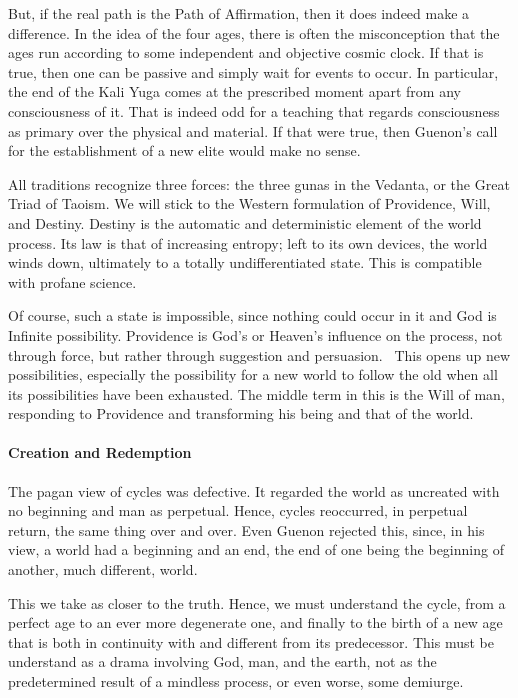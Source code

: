 But, if the real path is the Path of Affirmation, then it does indeed make a difference. In the idea of the four ages,
there is often the misconception that the ages run according to some independent and objective cosmic clock. If that is
true, then one can be passive and simply wait for events to occur. In particular, the end of the Kali Yuga comes at the
prescribed moment apart from any consciousness of it. That is indeed odd for a teaching that regards consciousness as
primary over the physical and material. If that were true, then Guenon's call for the
establishment of a new elite would make no sense.

All traditions recognize three forces: the three gunas in the Vedanta, or the Great Triad of Taoism. We will stick to
the Western formulation of Providence, Will, and Destiny. Destiny is the automatic and deterministic element of the
world process. Its law is that of increasing entropy; left to its own devices, the world winds down, ultimately to a
totally undifferentiated state. This is compatible with profane science.

Of course, such a state is impossible, since nothing could occur in it and God is Infinite possibility. Providence is
God's or Heaven's influence on the process, not through force, but rather
through suggestion and persuasion.  This opens up new possibilities, especially the possibility for a new world to
follow the old when all its possibilities have been exhausted. The middle term in this is the Will of man, responding
to Providence and transforming his being and that of the world.

\paragraph{Creation and Redemption}
The pagan view of cycles was defective. It regarded the world as uncreated with no beginning and man as perpetual.
Hence, cycles reoccurred, in perpetual return, the same thing over and over. Even Guenon rejected this, since, in his
view, a world had a beginning and an end, the end of one being the beginning of another, much different, world.

This we take as closer to the truth. Hence, we must understand the cycle, from a perfect age to an ever more degenerate
one, and finally to the birth of a new age that is both in continuity with and different from its predecessor. This
must be understand as a drama involving God, man, and the earth, not as the predetermined result of a mindless process,
or even worse, some demiurge.

